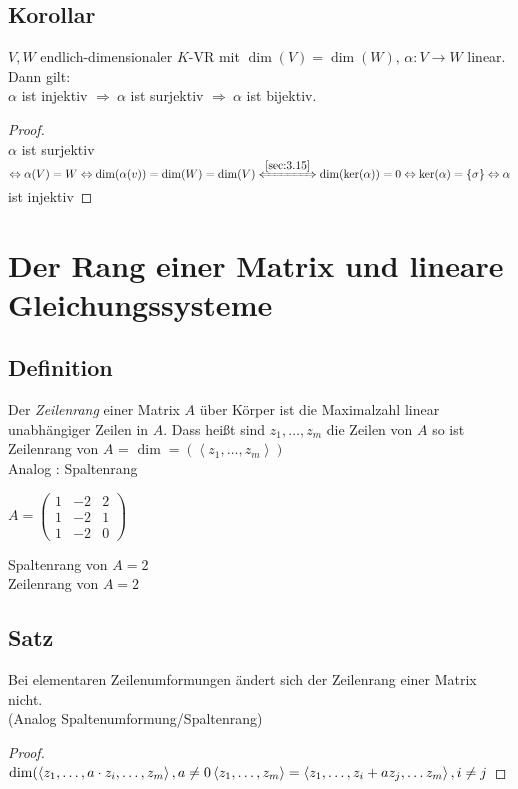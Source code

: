 \subsection{Korollar}\label{sec:3.16}
$V,W$ endlich-dimensionaler $K$-VR mit $\dim(V) = \dim(W),\, \alpha : V \to W$ linear. Dann gilt:\\
$\alpha$ ist injektiv $\Rightarrow\ \alpha$ ist surjektiv $\Rightarrow\ \alpha$ ist bijektiv.
\begin{proof}\ \\
$\alpha$ ist surjektiv $\Leftrightarrow \alpha(V) =W\\
 \Leftrightarrow \dim(\alpha(v) ) = \dim(W) = \dim(V)\\
\xLeftrightarrow{\ref{sec:3.15}} \dim(\ker(\alpha)) = 0 \Leftrightarrow \ker(\alpha) = \{ \sigma \} \Leftrightarrow \alpha$ ist injektiv
\end{proof}
\section{Der Rang einer Matrix und lineare Gleichungssysteme}
\subsection{Definition}\label{sec:\thesubsection}
Der \emph{Zeilenrang} einer Matrix $A$ über Körper ist die Maximalzahl linear unabhängiger Zeilen in $A$. Dass hei\ss t sind $z_1,\ldots,z_m$ die Zeilen von $A$ so ist Zeilenrang von $A$ = $\dim = (\left\langle z_1,\ldots,z_m\right\rangle)$\\
Analog : Spaltenrang\medskip\\
\begin{minipage}{.5\textwidth}
$A = \begin{pmatrix}
1&-2&2\\
1&-2&1\\
1&-2&0
\end{pmatrix}$ 
\end{minipage}%
\begin{minipage}{.5\textwidth}
Spaltenrang von $A = 2$\\
Zeilenrang von $A = 2$
\end{minipage}
\subsection{Satz}\label{sec:\thesubsection}
Bei elementaren Zeilenumformungen ändert sich der Zeilenrang einer Matrix nicht.\\ (Analog Spaltenumformung/Spaltenrang)
\begin{proof}$\dim(\left\langle z_1,\ldots,a \cdot z_i,\ldots,z_m\right\rangle, a \ne 0\\
\left\langle z_1,\ldots,z_m \right\rangle = \left\langle z_1,\ldots,z_i+az_j,\ldots z_m\right\rangle, i \ne j$
\end{proof}
